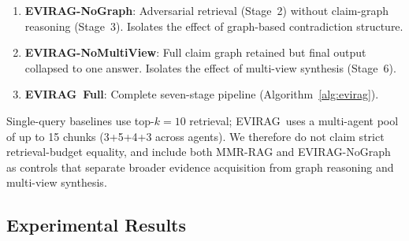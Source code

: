 \documentclass[11pt]{article}
\newcommand{\system}{\textsc{EVIRAG}\xspace}
\begin{document}
\begin{enumerate}[leftmargin=*,nosep,label=\arabic{enumi}.]
  \item \textbf{\system-NoGraph}: Adversarial retrieval (Stage~2) without
    claim-graph reasoning (Stage~3).  Isolates the effect of graph-based
    contradiction structure.
  \item \textbf{\system-NoMultiView}: Full claim graph retained but final
    output collapsed to one answer.  Isolates the effect of multi-view
    synthesis (Stage~6).
  \item \textbf{\system\ Full}: Complete seven-stage pipeline (Algorithm~\ref{alg:evirag}).
\end{enumerate}
Single-query baselines use top-$k{=}10$ retrieval; \system\ uses a
multi-agent pool of up to 15 chunks (3+5+4+3 across agents).  We therefore
do not claim strict retrieval-budget equality, and include both MMR-RAG and
\system-NoGraph as controls that separate broader evidence acquisition from
graph reasoning and multi-view synthesis.

\subsection{Experimental Results}
\label{sec:main-results}
\end{document}
